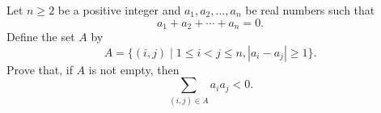 Let $n \geq 2$ be a positive integer and $a_1, a_2, \ldots, a_n$ be real numbers such that
\[ a_1 + a_2 + \cdots + a_n = 0. \]
Define the set $A$ by
\[ A = \big\{ (i, j) \mid 1 \leq i < j \leq n, |a_i - a_j| \geq 1 \big\}. \]
Prove that, if $A$ is not empty, then
\[ \sum_{(i,j) \in A} a_i a_j < 0. \]
